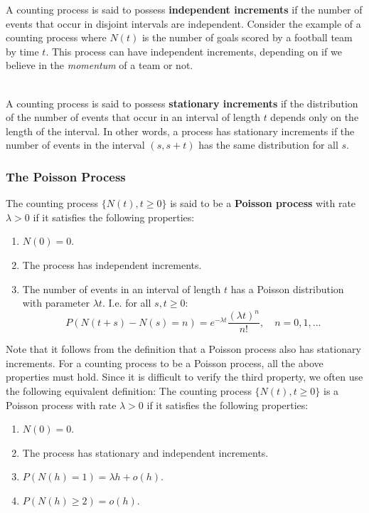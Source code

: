 \documentclass[12pt]{article}
\begin{document}
\newpage
\noindent
A counting process is said to possess \textbf{independent increments} if the number of events that occur in disjoint intervals are independent.
Consider the example of a counting process where $N(t)$ is the number of goals scored by a football team by time $t$.
This process can have independent increments, depending on if we believe in the \textit{momentum} of a team or not.

\noindent
\\
A counting process is said to possess \textbf{stationary increments} if the distribution of the number of events that occur in an interval of length $t$ depends only on the length of the interval.
In other words, a process has stationary increments if the number of events in the interval $(s, s + t)$ has the same distribution for all $s$. 

\subsubsection{The Poisson Process}
The counting process $\{ N(t), t \geq 0 \}$ is said to be a \textbf{Poisson process} with rate $\lambda > 0$ if it satisfies the following properties:

\begin{enumerate}
    \item $N(0) = 0$.
    \item The process has independent increments.
    \item The number of events in an interval of length $t$ has a Poisson distribution with parameter $\lambda t$.
    I.e. for all $s, t \geq 0$:
    \[ P(N(t + s) - N(s) = n) = e^{-\lambda t} \frac{(\lambda t)^n}{n!}, \quad n = 0, 1, ... \] 
\end{enumerate}

\noindent
Note that it follows from the definition that a Poisson process also has stationary increments.
For a counting process to be a Poisson process, all the above properties must hold.
Since it is difficult to verify the third property, we often use the following equivalent definition:
The counting process $\{ N(t), t \geq 0 \}$ is a Poisson process with rate $\lambda > 0$ if it satisfies the following properties:

\begin{enumerate}
    \item $N(0) = 0$.
    \item The process has stationary and independent increments.
    \item $P(N(h) = 1) = \lambda h + o(h)$.
    \item $P(N(h) \geq 2) = o(h)$.
\end{enumerate}
\end{document}
